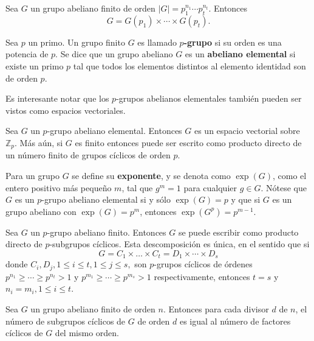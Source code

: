 \begin{lema}
Sea $G$ un grupo abeliano finito de orden $\mid G \mid = p_1^{n_1}\cdots p_t^{n_t}$. Entonces \[ G = G(p_1)\times \cdots \times G(p_t). \]
\end{lema}
\begin{definicion}
Sea $p$ un primo. Un grupo finito $G$ es llamado \textbf{$p$-grupo} si su orden es una potencia de $p$.
Se dice que un grupo abeliano $G$ es un \textbf{abeliano elemental} si existe un primo $p$ tal que todos los elementos distintos al elemento identidad son de orden $p$.
\end{definicion}
Es interesante notar que los $p$-grupos abelianos elementales también pueden ser vistos como espacios vectoriales.
\begin{lema}
Sea $G$ un $p$-grupo abeliano elemental. Entonces $G$ es un espacio vectorial sobre $\mathds{Z}_p$. Más aún, si $G$ es finito entonces puede ser escrito como producto directo de un número finito de grupos cíclicos de orden $p$.
\end{lema}
Para un grupo $G$ se define su \textbf{exponente}, y se denota como $\exp(G)$, como el entero positivo más pequeño $m$, tal que $g^m=1$ para cualquier $g \in G$. Nótese que $G$ es un $p$-grupo abeliano elemental si y sólo $\exp(G)=p$ y que si $G$ es un grupo abeliano con $\exp(G) = p^m$, entonces $\exp(G^p) = p^{m-1}$.
\begin{teorema}\label{teo:estructuraAbelianos}
Sea $G$ un $p$-grupo abeliano finito. Entonces $G$ se puede escribir como producto directo de $p$-subgrupos cíclicos. Esta descomposición es única, en el sentido que si
\[ G = C_1 \times \dots \times C_t = D_1 \times \cdots \times D_s \]
donde $C_i,D_j, 1\leq i \leq t, 1\leq j \leq s,$ son $p$-grupos cíclicos de órdenes $p^{n_1} \geq \cdots \geq p^{n_t}>1$ y $p^{m_1}\geq \cdots \geq p^{m_s}>1$ respectivamente, entonces $t=s$ y $n_i = m_i, 1\leq i \leq t$.
\end{teorema} 
\begin{proposicion}
Sea $G$ un grupo abeliano finito de orden $n$. Entonces para cada divisor $d$ de $n$, el número de subgrupos cíclicos de $G$ de orden $d$ es igual al número de factores cíclicos de $G$ del mismo orden.
\end{proposicion}

